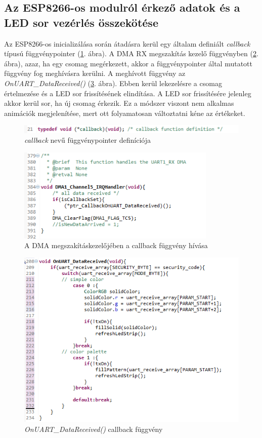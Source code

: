 \documentclass[../main.tex]{subfiles}
\begin{document}
    \subsection{Az ESP8266-os modulról érkező adatok és a LED sor vezérlés összekötése}
        Az ESP8266-os inicializálása során átadásra kerül egy általam definiált \textit{callback} típusú függvénypointer (\ref{fig:callback_typedef}. ábra). A DMA RX megszakítás kezelő függvényben (\ref{fig:callback_call}. ábra), azaz, ha egy csomag megérkezett, akkor a függvénypointer által mutatott függvény fog meghívásra kerülni. A meghívott függvény az \textit{OnUART_DataReceived()} (\ref{fig:callback_function}. ábra). Ebben kerül lekezelésre a csomag értelmezése és a LED sor frissítésének elindítása. A LED sor frissítésére jelenleg akkor kerül sor, ha új csomag érkezik. Ez a módszer viszont nem alkalmas animációk megjelenítése, mert ott folyamatosan változtatni kéne az értékeket.
        
        \begin{figure}[h!]
            \centering
                \includegraphics[width=11.5cm]{mbed_res/callback_typedef}
            \caption{\textit{callback} nevű függvénypointer definíciója}
            \label{fig:callback_typedef}
        \end{figure}
        
        \begin{figure}[h!]
            \centering
                \includegraphics[width=9.5cm]{mbed_res/callback_dma.png}
            \caption{A DMA megszakításkezelőjében a callback függvény hívása}
            \label{fig:callback_call}
        \end{figure}
        
        \begin{figure}[h!]
            \centering
                \includegraphics[width=11.5cm]{mbed_res/callback_function}
            \caption{\textit{OnUART_DataReceived()} callback függvény}
            \label{fig:callback_function}
        \end{figure}

\newpage            
\end{document}
